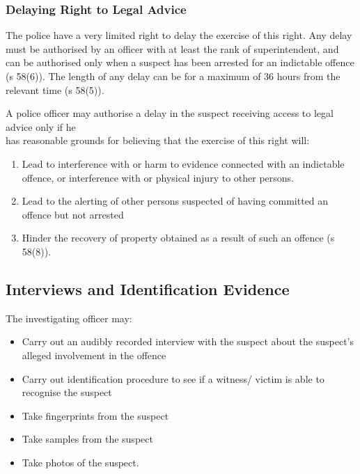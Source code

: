 \documentclass[
]{article}
\providecommand{\tightlist}{%
  \setlength{\itemsep}{0pt}\setlength{\parskip}{0pt}}
\begin{document}
\hypertarget{delaying-right-to-legal-advice}{%
\subsubsection{Delaying Right to Legal
Advice}\label{delaying-right-to-legal-advice}}

The police have a very limited right to delay the exercise of this
right. Any delay must be authorised by an officer with at least the rank
of superintendent, and can be authorised only when a suspect has been
arrested for an indictable offence (s 58(6)). The length of any delay
can be for a maximum of 36 hours from the relevant time (s 58(5)).

A police officer may authorise a delay in the suspect receiving access
to legal advice only if he\\
has reasonable grounds for believing that the exercise of this right
will:

\begin{enumerate}
\def\labelenumi{\arabic{enumi}.}
\tightlist
\item
  Lead to interference with or harm to evidence connected with an
  indictable offence, or interference with or physical injury to other
  persons.
\item
  Lead to the alerting of other persons suspected of having committed an
  offence but not arrested
\item
  Hinder the recovery of property obtained as a result of such an
  offence (s 58(8)).
\end{enumerate}

\hypertarget{interviews-and-identification-evidence}{%
\subsection{Interviews and Identification
Evidence}\label{interviews-and-identification-evidence}}

The investigating officer may:

\begin{itemize}
\tightlist
\item
  Carry out an audibly recorded interview with the suspect about the
  suspect's alleged involvement in the offence
\item
  Carry out identification procedure to see if a witness/ victim is able
  to recognise the suspect
\item
  Take fingerprints from the suspect
\item
  Take samples from the suspect
\item
  Take photos of the suspect.
\end{itemize}
\end{document}
